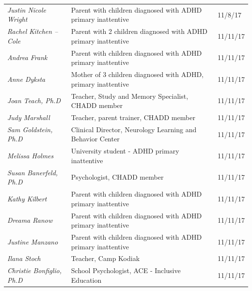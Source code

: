 \documentclass[letterpaper,10pt]{article}
\begin{document}
\begin{appendices}
\begin{table}[]
\begin{tabular}{lll}
\textit{Justin Nicole Wright}            & Parent with children diagnosed with ADHD primary inattentive           & 11/8/17                           \\
\textit{Rachel Kitchen – Cole}           & Parent with 2 children diagnosed with ADHD primary inattentive         & 11/11/17                          \\
\textit{Andrea Frank}                    & Parent with children diagnosed with ADHD primary inattentive           & 11/11/17                          \\
\textit{Anne Dyksta}                     & Mother of 3 children diagnosed with ADHD, primary inattentive          & 11/11/17                          \\
\textit{Joan Teach, Ph.D}                & Teacher, Study and Memory Specialist, CHADD member                                   & 11/11/17                          \\
\textit{Judy Marshall}                   & Teacher, parent trainer, CHADD member                                  & 11/11/17                          \\
\textit{Sam Goldstein, Ph.D}             & Clinical Director, Neurology Learning and Behavior Center              & 11/11/17                          \\
\textit{Melissa Holmes}                  & University student - ADHD primary inattentive                          & 11/11/17                          \\
\textit{Susan Banerfeld, Ph.D}           & Psychologist, CHADD member                                                          & 11/11/17                          \\
\textit{Kathy Kilbert}                   & Parent with children diagnosed with ADHD primary inattentive           & 11/11/17                          \\
\textit{Dreama Ranow}                    & Parent with children diagnosed with ADHD primary inattentive           & 11/11/17                          \\
\textit{Justine Manzano}                 & Parent with children diagnosed with ADHD primary inattentive           & 11/11/17                          \\
\textit{Ilana Stoch}                     & Teacher, Camp Kodiak                                                   & 11/11/17                          \\
\textit{Christie Bonfiglio, Ph.D}        & School Psychologist, ACE - Inclusive Education                         & 11/11/17                          \\

\end{tabular}
\end{table}
\end{appendices}
\end{document}
